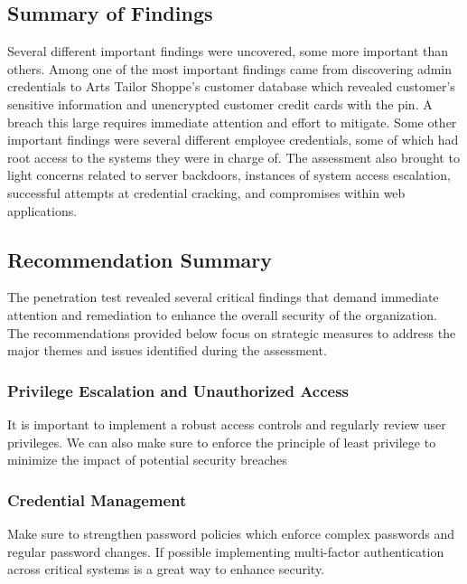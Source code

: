 \documentclass[notitlepage]{article}
\begin{document}
\subsection{Summary of Findings}


Several different important findings were uncovered, some more important than others. 
Among one of the most important findings came from discovering admin
credentials to Arts Tailor Shoppe's customer database which revealed customer's sensitive information
and unencrypted customer credit cards with the pin. A breach this large requires immediate attention and effort
to mitigate. Some other important findings were several different employee credentials, some of which had root access
to the systems they were in charge of. The assessment also brought to light concerns related to server backdoors, 
instances of system access escalation, successful attempts at credential cracking, and compromises within web applications.

\subsection{Recommendation Summary}


The penetration test revealed several critical findings that demand immediate attention and remediation to enhance the overall security of the organization. 
The recommendations provided below focus on strategic measures to address the major themes and issues identified during the assessment.

\subsubsection*{Privilege Escalation and Unauthorized Access}
It is important to implement a robust access controls and regularly review user privileges. We can also
make sure to enforce the principle of least privilege to minimize the impact of potential security breaches


\subsubsection*{Credential Management}
Make sure to strengthen password policies which enforce complex passwords and regular password changes. If possible
implementing multi-factor authentication across critical systems is a great way to enhance security.
\end{document}
